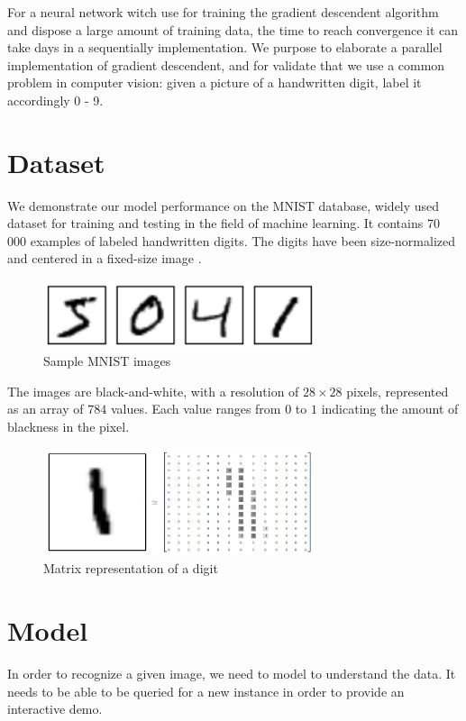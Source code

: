 \documentclass[a4paper]{article}
\begin{document}
For a neural network witch use for training the gradient descendent algorithm and dispose a large amount of training data, the time to reach convergence it can take days in a sequentially implementation.
We purpose to elaborate a parallel implementation of gradient descendent, and for validate that we use a common problem in computer vision: given a picture of a handwritten digit, label it accordingly 0 - 9.

\section{Dataset}
\label{sec:dataset}
We demonstrate our model performance on the MNIST database, widely used dataset for training and testing in the field of machine learning. It contains 70 000 examples of labeled handwritten digits. The digits have been size-normalized and centered in a fixed-size image \cite{mnist}. 

\begin{figure}[htb]
\centering
\includegraphics[width=8cm]{images/mnist-images.png}
\caption{Sample MNIST images \cite{tf}}
\end{figure}


The images are black-and-white, with a resolution of $28 \times 28$ pixels, represented as an array of $784$ values. Each value ranges from $0$ to $1$ indicating the amount of blackness in the pixel.

\begin{figure}[htb]
\centering
\includegraphics[width=8cm]{images/mnist-matrix.png}
\caption{Matrix representation of a digit \cite{tf}}
\end{figure}


\newpage
\section{Model}
\label{sec:model}
In order to recognize a given image, we need to model to understand the data. It needs to be able to be queried for a new instance in order to provide an interactive demo.
\\
\end{document}
